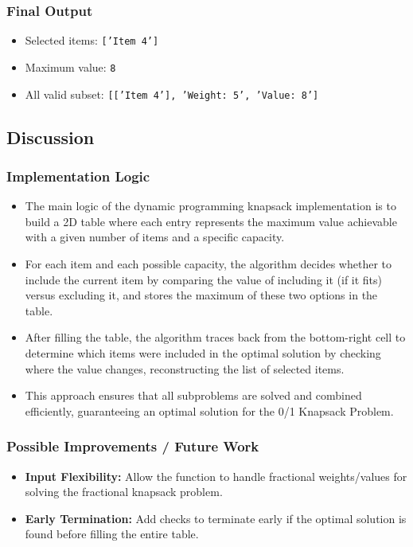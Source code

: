 \documentclass{article}
\begin{document}
\subsubsection*{Final Output}
\begin{itemize}
    \item Selected items: \texttt{['Item 4']}
    \item Maximum value: \texttt{8}
    \item All valid subset: \texttt{[['Item 4'], 'Weight: 5', 'Value: 8']}
\end{itemize}

\subsection*{Discussion}
\subsubsection*{Implementation Logic}
\begin{itemize}
    \item The main logic of the dynamic programming knapsack implementation is to build a 2D table where each entry represents the maximum value achievable with a given number of items and a specific capacity.
    \item For each item and each possible capacity, the algorithm decides whether to include the current item by comparing the value of including it (if it fits) versus excluding it, and stores the maximum of these two options in the table.
    \item After filling the table, the algorithm traces back from the bottom-right cell to determine which items were included in the optimal solution by checking where the value changes, reconstructing the list of selected items.
    \item This approach ensures that all subproblems are solved and combined efficiently, guaranteeing an optimal solution for the 0/1 Knapsack Problem.
\end{itemize}

\subsubsection*{Possible Improvements / Future Work} 
\begin{itemize}
    \item \textbf{Input Flexibility:} Allow the function to handle fractional weights/values for solving the fractional knapsack problem.
    \item \textbf{Early Termination:} Add checks to terminate early if the optimal solution is found before filling the entire table.
\end{itemize}
\end{document}
